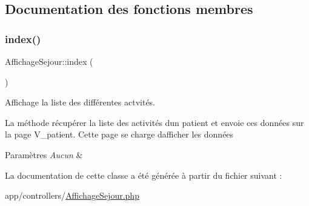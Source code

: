 \subsection{Documentation des fonctions membres}
\mbox{\label{class_affichage_sejour_a2fd132a942884e1832531f02b516d42f}} 
\subsubsection{\texorpdfstring{index()}{index()}}
{\footnotesize\ttfamily Affichage\+Sejour\+::index (\begin{DoxyParamCaption}{ }\end{DoxyParamCaption})}



Affichage la liste des différentes actvités. 

La méthode récupérer la liste des activités d\textquotesingle{}un patient et envoie ces données sur la page V\+\_\+patient. Cette page se charge d\textquotesingle{}afficher les données 
\begin{DoxyParams}{Paramètres}
{\em Aucun} & \\
\hline
\end{DoxyParams}


La documentation de cette classe a été générée à partir du fichier suivant \+:\begin{DoxyCompactItemize}
\item 
app/controllers/\hyperlink{_affichage_sejour_8php}{Affichage\+Sejour.\+php}\end{DoxyCompactItemize}
